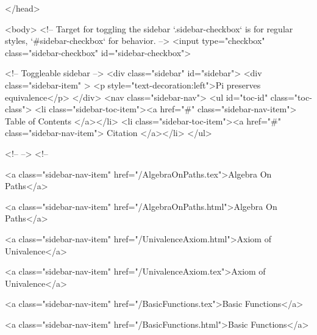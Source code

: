   
</head>




  <body>
    <!-- Target for toggling the sidebar `.sidebar-checkbox` is for regular
     styles, `#sidebar-checkbox` for behavior. -->
<input type="checkbox" class="sidebar-checkbox" id="sidebar-checkbox">

<!-- Toggleable sidebar -->
<div class="sidebar" id="sidebar">
  <div class="sidebar-item" >
    <p style="text-decoration:left">Pi preserves equivalence</p>
  </div>
  <nav class="sidebar-nav">
    <ul id="toc-id" class="toc-class">
  <li class="sidebar-toc-item"><a href="#" class="sidebar-nav-item"> Table of Contents </a></li>
  <li class="sidebar-toc-item"><a href="#" class="sidebar-nav-item"> Citation </a></li>
</ul>


    <!--  -->
    <!-- 
      
    
      
    
      
    
      
        
      
    
      
        
          <a class="sidebar-nav-item" href="/AlgebraOnPaths.tex">Algebra On Paths</a>
        
      
    
      
        
          <a class="sidebar-nav-item" href="/AlgebraOnPaths.html">Algebra On Paths</a>
        
      
    
      
        
          <a class="sidebar-nav-item" href="/UnivalenceAxiom.html">Axiom of Univalence</a>
        
      
    
      
        
          <a class="sidebar-nav-item" href="/UnivalenceAxiom.tex">Axiom of Univalence</a>
        
      
    
      
        
          <a class="sidebar-nav-item" href="/BasicFunctions.tex">Basic Functions</a>
        
      
    
      
        
          <a class="sidebar-nav-item" href="/BasicFunctions.html">Basic Functions</a>
        
      
    
      
        
